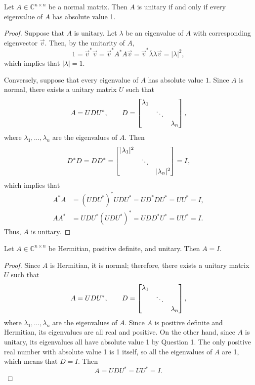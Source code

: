 \documentclass{homework}
\begin{document}
	\maketitle
	
	\question Let $A \in \mathbb{C}^{n\times n}$ be a normal matrix. Then $A$ is unitary if and only if every eigenvalue of $A$ has absolute value 1.
	
	\begin{proof}
		Suppose that $A$ is unitary. Let $\lambda$ be an eigenvalue of $A$ with corresponding eigenvector $\vec{v}$. Then, by the unitarity of $A$,
		\begin{equation*}
			1 = \vec{v}^*\vec{v} = \vec{v}^*A^*A\vec{v} = \vec{v}^*\bar{\lambda}\lambda\vec{v} = |\lambda|^2,
		\end{equation*}
		which implies that $|\lambda| = 1$.
		
		Conversely, suppose that every eigenvalue of $A$ has absolute value $1$. Since $A$ is normal, there exists a unitary matrix $U$ such that
		\begin{equation*}
			A = UDU^*, \qquad D = \left[\begin{matrix}\lambda_1 & & \\ & \ddots & \\ & & \lambda_n\end{matrix}\right],
		\end{equation*}
		where $\lambda_1, \dots, \lambda_n$ are the eigenvalues of $A$. Then
		\begin{equation*}
			D^*D = DD^* = \left[\begin{matrix}|\lambda_1|^2 & & \\ & \ddots &\\ & & |\lambda_n|^2\end{matrix}\right] = I,
		\end{equation*}
		which implies that
		\begin{equation*}
			\begin{aligned}
			A^*A &= (UDU^*)^*UDU^* = UD^*DU^* = UU^* = I, \\ AA^* &= UDU^*(UDU^*)^* = UDD^*U^* = UU^* = I.
			\end{aligned}
		\end{equation*}
		Thus, $A$ is unitary.
	\end{proof}
	
	\question Let $A \in \mathbb{C}^{n\times n}$ be Hermitian, positive definite, and unitary. Then $A = I$.
	\begin{proof}
		Since $A$ is Hermitian, it is normal; therefore, there exists a unitary matrix $U$ such that
		\begin{equation*}
			A = UDU^*, \qquad D = \left[\begin{matrix}\lambda_1&&\\&\ddots&\\&&\lambda_n\end{matrix}\right],
		\end{equation*}
		where $\lambda_1, \dots, \lambda_n$ are the eigenvalues of $A$. Since $A$ is positive definite and Hermitian, its eigenvalues are all real and positive. On the other hand, since $A$ is unitary, its eigenvalues all have absolute value 1 by Question 1. The only positive real number with absolute value 1 is 1 itself, so all the eigenvalues of $A$ are 1, which means that $D = I$. Then
		\begin{equation*}
			A = UDU^* = UU^* = I.
		\end{equation*}
	\end{proof}
	
\end{document}
